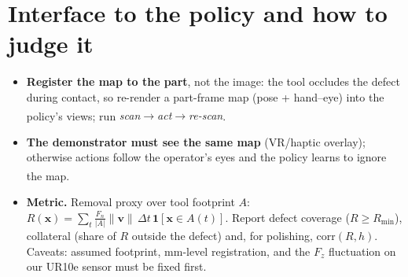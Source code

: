 \documentclass[10pt,a4paper]{article}
\newcommand{\infr}{\textsuperscript{\textcolor{cB}{\dag}}}
\begin{document}
\section{Interface to the policy and how to judge it}
\begin{itemize}
\item \textbf{Register the map to the part}, not the image: the tool occludes the defect during contact, so re-render a part-frame map (pose + hand--eye) into the policy's views; run \emph{scan$\to$act$\to$re-scan}.\infr
\item \textbf{The demonstrator must see the same map} (VR/haptic overlay); otherwise actions follow the operator's eyes and the policy learns to ignore the map.\infr
\item \textbf{Metric.}
Removal proxy over tool footprint $A$: $R(\mathbf{x})=\sum_t \tfrac{F_n}{|A|}\|\mathbf{v}\|\,\Delta t\,\mathbf{1}[\mathbf{x}\!\in\!
A(t)]$.
Report defect coverage ($R\ge R_{\min}$), collateral (share of $R$ outside the defect) and, for polishing, $\mathrm{corr}(R,h)$.
Caveats: assumed footprint, mm-level registration, and the $F_z$ fluctuation on our UR10e sensor must be fixed first.
\end{itemize}
\end{document}
